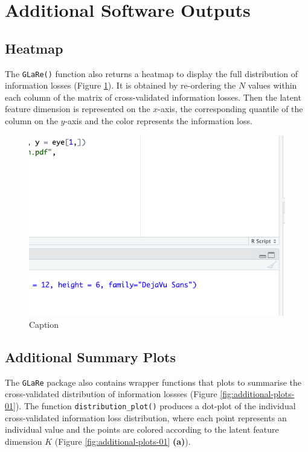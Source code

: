 \section{Additional Software Outputs}\label{sec:additional-outputs}


\subsection{Heatmap}

The \texttt{GLaRe()} function also returns a heatmap to display the full distribution of information losses (Figure \ref{fig:eye-heatmap}).
It is obtained by re-ordering the $N$ values within each column of the matrix of cross-validated information losses.
Then the latent feature dimension is represented on the $x$-axis, the corresponding quantile of the column on the $y$-axis and the color represents the information loss.


\begin{figure}
    \centering
    \includegraphics[width=0.75\linewidth]{figures/eye-heatmap.png}
    \caption{Caption}
    \label{fig:eye-heatmap}
\end{figure}

\subsection{Additional Summary Plots}

The \texttt{GLaRe} package also contains wrapper functions that plots to summarise the cross-validated distribution of information lossses (Figure \ref{fig:additional-plots-01}).
The function \texttt{distribution\_plot()} produces a dot-plot of the individual cross-validated information loss distribution, where each point represents an individual value and the points are colored according to the latent feature dimension $K$ (Figure \ref{fig:additional-plots-01} \textbf{(a)}).

